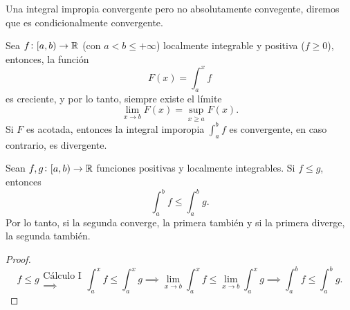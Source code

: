 \begin{defi}
    Una integral impropia convergente pero no absolutamente convegente, diremos que
    es condicionalmente convergente.
\end{defi}

\begin{prop}
    Sea $f \colon [a,b) \to \mathbb{R}$ (con $a < b \leq +\infty$) localmente integrable
    y positiva ($f \geq 0$), entonces, la función
    \[
        F(x) = \int^x_a f
    \]
    es creciente, y por lo tanto, siempre existe el límite
    \[
        \lim_{x \to b} F(x) = \sup_{x \geq a} F(x).
    \]
    Si $F$ es acotada, entonces la integral imporopia $\int^b_a f$ es convergente,
    en caso contrario, es divergente.
\end{prop}

\begin{prop}
    Sean $f,g \colon [a,b) \to \mathbb{R}$ funciones positivas y localmente integrables.
    Si $f \leq g$, entonces
    \[
        \int^b_a f \leq \int^b_a g.
    \]
    Por lo tanto, si la segunda converge, la primera tambi\'en y si la primera 
    diverge, la segunda tambi\'en.
\end{prop}
\begin{proof}
    \[
        f \leq g \substack{\text{Cálculo I} \\ \implies}
        \int^x_a f \leq \int^x_a g \implies \lim_{x \to b} \int^x_a f \leq
        \lim_{x \to b} \int^x_a g \implies \int^b_a f \leq \int^b_a g.
    \]
\end{proof}

